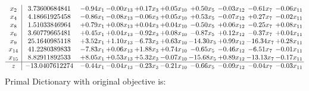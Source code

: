 \documentclass[9pt]{article}
\begin{document}
\[\begin{array}{c| c c@{\hskip 2pt} c@{\hskip 2pt} c@{\hskip 2pt} c@{\hskip 2pt} c@{\hskip 2pt} c@{\hskip 2pt} c@{\hskip 2pt} c@{\hskip 2pt} }
 x_{2}   &  3.73600684841 & -0.94 x_{1} & -0.00 x_{13} & +  0.17 x_{3} & +  0.05 x_{10} & +  0.50 x_{5} & -0.03 x_{12} & -0.61 x_{7} & -0.06 x_{11}\\
 x_{4}   &  4.18661925458 & -0.86 x_{1} & -0.08 x_{13} & -0.06 x_{3} & +  0.05 x_{10} & +  0.53 x_{5} & -0.07 x_{12} & +  0.27 x_{7} & -0.02 x_{11}\\
 x_{8}   &  1.51033846964 & +  0.79 x_{1} & +  0.08 x_{13} & +  0.04 x_{3} & +  0.04 x_{10} & -0.50 x_{5} & +  0.06 x_{12} & -0.25 x_{7} & +  0.08 x_{11}\\
 x_{6}   &  3.60779665481 & +  0.45 x_{1} & +  0.04 x_{13} & -0.92 x_{3} & +  0.08 x_{10} & -0.87 x_{5} & +  0.12 x_{12} & -0.37 x_{7} & +  0.04 x_{11}\\
 x_{9}   &  25.1640985118 & +  3.52 x_{1} & +  1.10 x_{13} & -6.73 x_{3} & +  0.63 x_{10} & -14.30 x_{5} & +  0.99 x_{12} & -16.34 x_{7} & +  0.28 x_{11}\\
 x_{14}   &  41.2280389833 & -7.83 x_{1} & +  0.06 x_{13} & +  1.88 x_{3} & +  0.74 x_{10} & -0.65 x_{5} & -0.46 x_{12} & -6.51 x_{7} & -0.01 x_{11}\\
 x_{15}   &  8.82911892533 & +  8.05 x_{1} & +  0.53 x_{13} & +  5.32 x_{3} & -0.07 x_{10} & -15.68 x_{5} & +  0.89 x_{12} & -13.13 x_{7} & -0.17 x_{11}\\
\hline
z    &  -13.0407612274 & -0.44 x_{1} & -0.04 x_{13} & -0.23 x_{3} & -0.21 x_{10} & -0.66 x_{5} & -0.09 x_{12} & -0.04 x_{7} & -0.03 x_{11}\\
\end{array}\]
Primal Dictionary with original objective is:
\end{document}
